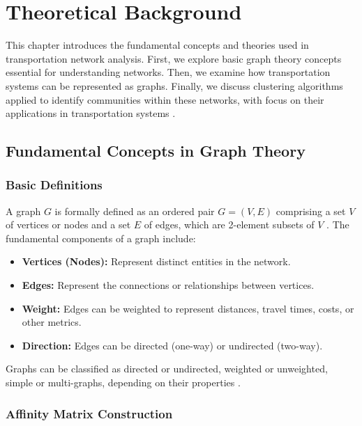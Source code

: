 \chapter{Theoretical Background}
\label{ch:basics}
This chapter introduces the fundamental concepts and theories used in transportation network analysis. First, we explore basic graph theory concepts essential for understanding networks. Then, we examine how transportation systems can be represented as graphs. Finally, we discuss clustering algorithms applied to identify communities within these networks, with focus on their applications in transportation systems \cite{newman2010networks}.

\section{Fundamental Concepts in Graph Theory}
\label{se:FundamentalConcepts}

\subsection{Basic Definitions}
\label{subsec:BasicDefinitions}

A graph $G$ is formally defined as an ordered pair $G = (V, E)$ comprising a set $V$ of vertices or nodes and a set $E$ of edges, which are 2-element subsets of $V$ \cite{west2001introduction}. The fundamental components of a graph include:

\begin{itemize}
    \item \textbf{Vertices (Nodes):} Represent distinct entities in the network.
    \item \textbf{Edges:} Represent the connections or relationships between vertices.
    \item \textbf{Weight:} Edges can be weighted to represent distances, travel times, costs, or other metrics.
    \item \textbf{Direction:} Edges can be directed (one-way) or undirected (two-way).
\end{itemize}

Graphs can be classified as directed or undirected, weighted or unweighted, simple or multi-graphs, depending on their properties \cite{bondy1976graph}.

\subsection{Affinity Matrix Construction}
\label{subsec:AffinityMatrix}

